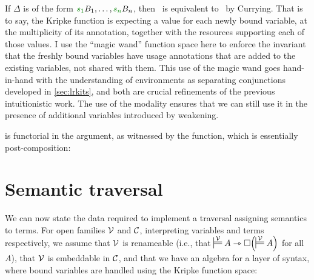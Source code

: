 If $\Delta$ is of the form $\gr{s_1}B_1, \ldots, \gr{s_n}B_n$, then
\ is equivalent to
\ by Currying.  That is
to say, the Kripke function is expecting a value for each newly bound
variable, at the multiplicity of its annotation, together with the
resources supporting each of those values. I use the ``magic wand''
function space here to enforce the invariant that the freshly bound
variables have usage annotations that are added to the existing
variables, not shared with them.
This use of the magic wand goes hand-in-hand with the understanding of
environments as separating conjunctions developed in \cref{sec:lrkits}, and both
are crucial refinements of the previous intuitionistic work.
The use of the
 modality ensures that we can still use it in
the presence of additional variables introduced by weakening.

 is functorial in the \AgdaBound{$\C$} argument,
as witnessed by the  function, which is essentially
post-composition:




\section{Semantic traversal}\label{sec:traversal}

We can now state the data required to implement a traversal assigning
semantics to terms. For open families $\mathcal V$ and $\C$, interpreting
variables and terms respectively, we assume that $\mathcal V$ is renameable
(i.e., that $\sdtstile{}\V A \rightarrowtriangle \Box\plr{\sdtstile{}\V A}$ for
all $A$),
that $\mathcal V$ is embeddable in $\C$, and that we have an algebra for a
layer of syntax, where bound variables are handled using the Kripke
function space:


